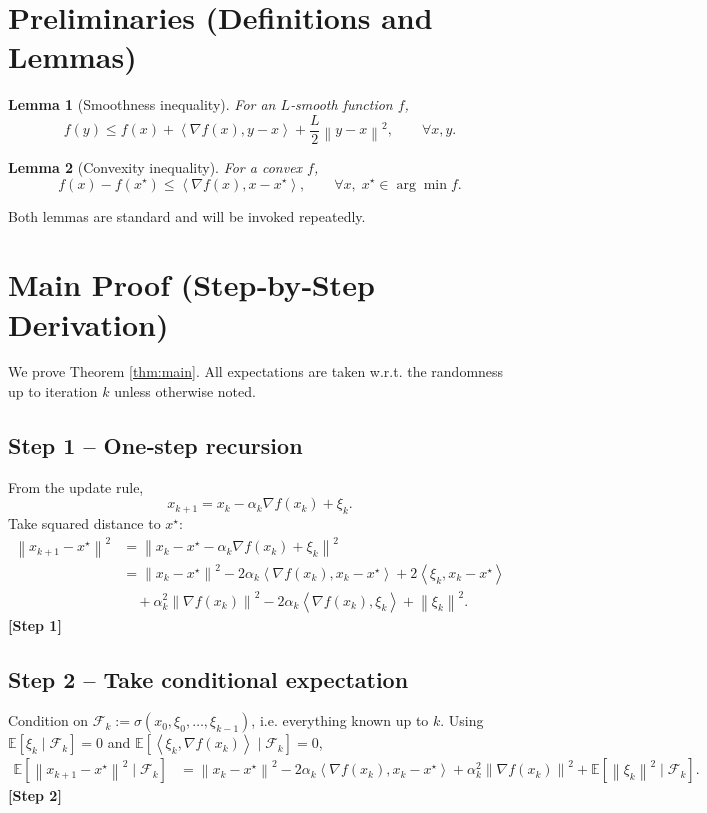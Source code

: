 \documentclass{article}
\newtheorem{lemma}{Lemma}
\newcommand{\E}{\mathbb{E}}
\newcommand{\norm}[1]{\left\lVert #1\right\rVert}
\newcommand{\ip}[2]{\left\langle #1,#2\right\rangle}
\begin{document}
\newpage
\section*{Preliminaries (Definitions and Lemmas)}
\begin{lemma}[Smoothness inequality]\label{lem:smooth}
For an $L$‑smooth function $f$,
\[
f(y)\le f(x)+\ip{\nabla f(x)}{y-x}+\frac{L}{2}\norm{y-x}^{2},\qquad\forall x,y.
\]
\end{lemma}
\begin{lemma}[Convexity inequality]\label{lem:conv}
For a convex $f$,
\[
f(x)-f(x^\star)\le\ip{\nabla f(x)}{x-x^\star},\qquad \forall x,\;x^\star\in\arg\min f.
\]
\end{lemma}
Both lemmas are standard and will be invoked repeatedly.

\section*{Main Proof (Step‑by‑Step Derivation)}
We prove Theorem \ref{thm:main}.  
All expectations are taken w.r.t. the randomness up to iteration $k$ unless otherwise noted.

\subsection*{Step 1 – One‑step recursion}
From the update rule,
\[
x_{k+1}=x_k-\alpha_k\nabla f(x_k)+\xi_k .
\]
Take squared distance to $x^\star$:
\[
\begin{aligned}
\norm{x_{k+1}-x^\star}^{2}
&=\norm{x_k-x^\star-\alpha_k\nabla f(x_k)+\xi_k}^{2}\\
&=\norm{x_k-x^\star}^{2}
-2\alpha_k\ip{\nabla f(x_k)}{x_k-x^\star}
+2\ip{\xi_k}{x_k-x^\star}\\
&\quad+\alpha_k^{2}\norm{\nabla f(x_k)}^{2}
-2\alpha_k\ip{\nabla f(x_k)}{\xi_k}
+\norm{\xi_k}^{2}. \tag{1}
\end{aligned}
\]
\textbf{[Step 1]}

\subsection*{Step 2 – Take conditional expectation}
Condition on $\mathcal F_k:=\sigma(x_0,\xi_0,\dots,\xi_{k-1})$, i.e. everything known up to $k$.
Using $\E[\xi_k\mid\mathcal F_k]=0$ and $\E[\ip{\xi_k}{\nabla f(x_k)}\mid\mathcal F_k]=0$,
\[
\begin{aligned}
\E\!\left[\norm{x_{k+1}-x^\star}^{2}\mid\mathcal F_k\right]
&=\norm{x_k-x^\star}^{2}
-2\alpha_k\ip{\nabla f(x_k)}{x_k-x^\star}
+\alpha_k^{2}\norm{\nabla f(x_k)}^{2}
+\E\!\left[\norm{\xi_k}^{2}\mid\mathcal F_k\right].
\end{aligned}
\tag{2}
\]
\textbf{[Step 2]}
\end{document}
